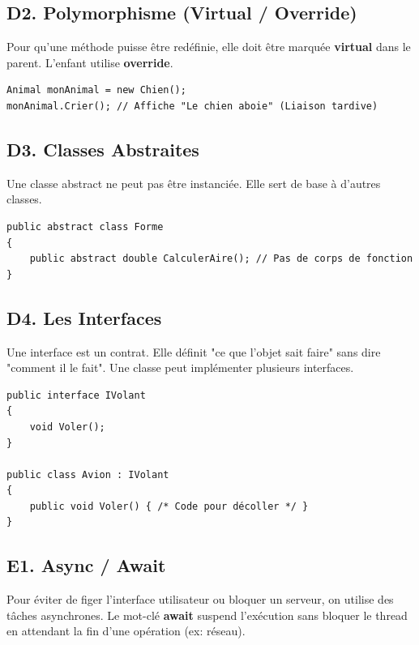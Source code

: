 \subsection*{D2. Polymorphisme (Virtual / Override)}
{}
\noindent Pour qu'une méthode puisse être redéfinie, elle doit être marquée \textbf{virtual} dans le parent. L'enfant utilise \textbf{override}.

\vspace{0.5cm}

\begin{verbatim}
Animal monAnimal = new Chien();
monAnimal.Crier(); // Affiche "Le chien aboie" (Liaison tardive)
\end{verbatim}

\subsection*{D3. Classes Abstraites}
{}
\noindent Une classe abstract ne peut pas être instanciée. Elle sert de base à d'autres classes.

\vspace{0.5cm}

\begin{verbatim}
public abstract class Forme
{
    public abstract double CalculerAire(); // Pas de corps de fonction
}
\end{verbatim}

\newpage

\subsection*{D4. Les Interfaces}
{}
\noindent Une interface est un contrat. Elle définit "ce que l'objet sait faire" sans dire "comment il le fait". Une classe peut implémenter plusieurs interfaces.

\vspace{0.5cm}

\begin{verbatim}
public interface IVolant
{
    void Voler();
}

public class Avion : IVolant
{
    public void Voler() { /* Code pour décoller */ }
}
\end{verbatim}

\subsection*{E1. Async / Await}
{}
\noindent Pour éviter de figer l'interface utilisateur ou bloquer un serveur, on utilise des tâches asynchrones. Le mot-clé \textbf{await} suspend l'exécution sans bloquer le thread en attendant la fin d'une opération (ex: réseau).

